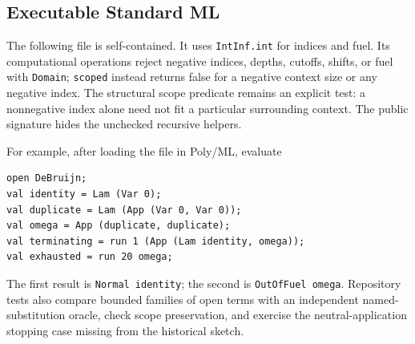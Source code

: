 \subsection{Executable Standard ML}
The following file is self-contained. It uses \texttt{IntInf.int}
for indices and fuel. Its computational operations reject negative
indices, depths, cutoffs, shifts, or fuel with \texttt{Domain};
\texttt{scoped} instead returns false for a negative context size or
any negative index. The structural scope predicate remains an explicit test: a nonnegative
index alone need not fit a particular surrounding context. The public
signature hides the unchecked recursive helpers.
\begin{nolinenumbers}

\end{nolinenumbers}
For example, after loading the file in Poly/ML, evaluate
\begin{lstlisting}
open DeBruijn;
val identity = Lam (Var 0);
val duplicate = Lam (App (Var 0, Var 0));
val omega = App (duplicate, duplicate);
val terminating = run 1 (App (Lam identity, omega));
val exhausted = run 20 omega;
\end{lstlisting}
The first result is \texttt{Normal identity}; the second is
\texttt{OutOfFuel omega}. Repository tests also compare bounded
families of open terms with an independent named-substitution oracle,
check scope preservation, and exercise the neutral-application stopping
case missing from the historical sketch.

